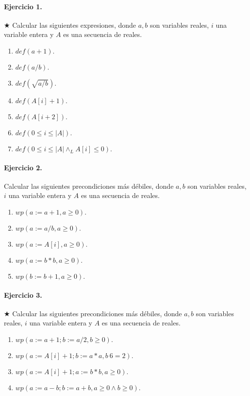 \documentclass[a4paper]{article}
\begin{document}

\paragraph{Ejercicio 1.} $\bigstar$ Calcular las siguientes expresiones, donde $a, b$ son variables 
reales, $i$ una variable entera y $A$ es una secuencia
de reales.

\begin{enumerate}[label=\alph*)]
\item $def(a + 1).$
\item $def(a/b).$
\item $def( \sqrt{a/b}).$
\item $def(A[i] + 1).$
\item $def(A[i + 2]).$
\item $def(0 \leq i \leq |A|).$
\item $def(0 \leq i \leq |A| \wedge_L A[i] \leq 0).$
\end{enumerate}

\paragraph{Ejercicio 2.} Calcular las siguientes precondiciones más débiles, donde 
$a, b$ son variables reales, $i$ una variable entera y $A$ es
una secuencia de reales.

\begin{enumerate}[label=\alph*)]
\item $wp(a := a+1, a \geq 0).$
\item $wp(a := a/b, a \geq 0).$
\item $wp(a := A[i], a \geq 0).$
\item $wp(a := b*b, a \geq 0).$
\item $wp(b := b+1, a \geq 0).$
\end{enumerate}

\paragraph{Ejercicio 3.} $\bigstar$ Calcular las siguientes precondiciones más débiles, donde 
$a, b$ son variables reales, $i$ una variable entera y $A$
es una secuencia de reales.

\begin{enumerate}[label=\alph*)]
\item $wp(a := a+1; b := a/2, b \geq 0).$
\item $wp(a := A[i] + 1; b := a*a, b\  6= 2).$
\item $wp(a := A[i] + 1; a := b*b, a \geq 0).$
\item $wp(a := a-b; b := a+b, a \geq 0 \wedge b \geq 0).$
\end{enumerate}
\end{document}
